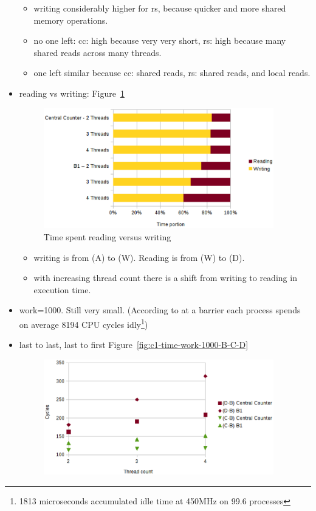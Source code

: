 \documentclass[a4paper, 10pt]{article}
\begin{document}
\begin{itemize}
\begin{itemize}
			\item writing considerably higher for rs, because quicker and more shared memory operations.
			\item no one left: cc: high because very very short, rs: high because many shared reads across many threads.
			\item one left similar because cc: shared reads, rs: shared reads, and local reads.
		\end{itemize}
	\item reading vs writing: Figure~\ref{fig:c1-time-work-100-percent}
		\begin{figure}[htbp]
			\centering
			\includegraphics[width=10cm]{charts/c1-time-work-100-percent}
			\caption{Time spent reading versus writing}
			\label{fig:c1-time-work-100-percent}
		\end{figure}
		\begin{itemize}
			\item writing is from (A) to (W). Reading is from (W) to (D).
			\item with increasing thread count there is a shift from writing to reading in execution time.
		\end{itemize}
	\item work=1000. Still very small. (According to \cite{rab00} at a barrier each process spends on average 8194 CPU cycles idly\footnote{1813 microseconds accumulated idle time at 450MHz on 99.6 processes})
	\item last to last, last to first Figure~\ref{fig:c1-time-work-1000-B-C-D}
		\begin{figure}[htbp]
			\centering
			\includegraphics[width=10cm]{charts/c1-time-work-1000-B-C-D}

\end{figure}
\end{itemize}
\end{document}
